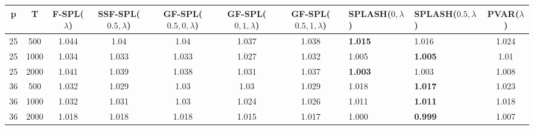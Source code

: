 \begin{tabular}{cccccccllc}
\hline
  p  &  T   &  F-SPL($\lambda$)  &  SSF-SPL($0.5, \lambda$)  &  GF-SPL($0.5, 0, \lambda$)  &  GF-SPL($0, 1, \lambda$)  &  GF-SPL($0.5, 1, \lambda$)  & SPLASH($0, \lambda$)   & SPLASH($0.5, \lambda$)   &  PVAR($\lambda$)  \\
\hline
 25  & 500  &       1.044        &           1.04            &            1.04             &           1.037           &            1.038            & \textbf{1.015}         & 1.016                    &       1.024       \\
 25  & 1000 &       1.034        &           1.033           &            1.033            &           1.027           &            1.032            & 1.005                  & \textbf{1.005}           &       1.01        \\
 25  & 2000 &       1.041        &           1.039           &            1.038            &           1.031           &            1.037            & \textbf{1.003}         & 1.003                    &       1.008       \\
 36  & 500  &       1.032        &           1.029           &            1.03             &           1.03            &            1.029            & 1.018                  & \textbf{1.017}           &       1.023       \\
 36  & 1000 &       1.032        &           1.031           &            1.03             &           1.024           &            1.026            & 1.011                  & \textbf{1.011}           &       1.018       \\
 36  & 2000 &       1.018        &           1.018           &            1.018            &           1.015           &            1.017            & 1.000                  & \textbf{0.999}           &       1.007       \\
\hline
\end{tabular}
